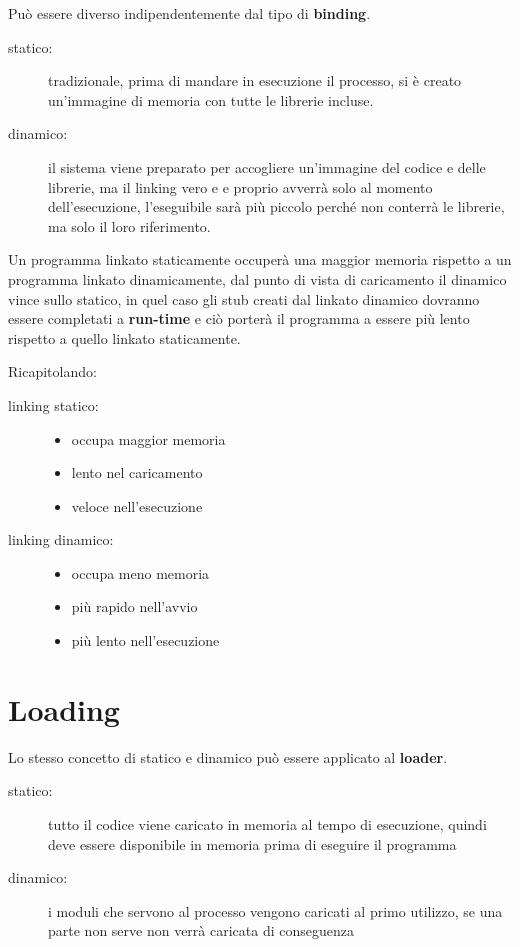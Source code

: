 \documentclass[a4paper, 12pt]{book}
\begin{document}
Può essere diverso indipendentemente dal tipo di \textbf{binding}.
\begin{description}
    \item[statico:] tradizionale, prima di mandare in esecuzione il processo, si è creato un'immagine di memoria con 
    tutte le librerie incluse.
    \item[dinamico:]il sistema viene preparato per accogliere un'immagine del codice e delle librerie, ma il linking vero e
    e proprio avverrà solo al momento dell'esecuzione, l'eseguibile sarà più piccolo perché non conterrà le librerie, ma solo 
    il loro riferimento.  
\end{description}

Un programma linkato staticamente occuperà una maggior memoria rispetto a un programma linkato dinamicamente, dal punto di vista
di caricamento il dinamico vince sullo statico, in quel caso gli stub creati dal linkato dinamico dovranno essere completati a 
\textbf{run-time} e ciò porterà il programma a essere più lento rispetto a quello linkato staticamente.

Ricapitolando:
\begin{description}
    \item[linking statico:]\begin{itemize}
        \item occupa maggior memoria
        \item lento nel caricamento
        \item veloce nell'esecuzione
    \end{itemize} 
    \item[linking dinamico:]\begin{itemize}
        \item occupa meno memoria
        \item più rapido nell'avvio
        \item più lento nell'esecuzione
    \end{itemize}
\end{description}

\section{Loading}

Lo stesso concetto di statico e dinamico può essere applicato al \textbf{loader}.
\begin{description}
    \item[statico:] tutto il codice viene caricato in memoria al tempo di esecuzione, quindi deve essere disponibile in 
    memoria prima di eseguire il programma
    \item[dinamico:] i moduli che servono al processo vengono caricati al primo utilizzo, se una parte non serve non verrà
    caricata di conseguenza 
\end{description}
\end{document}
